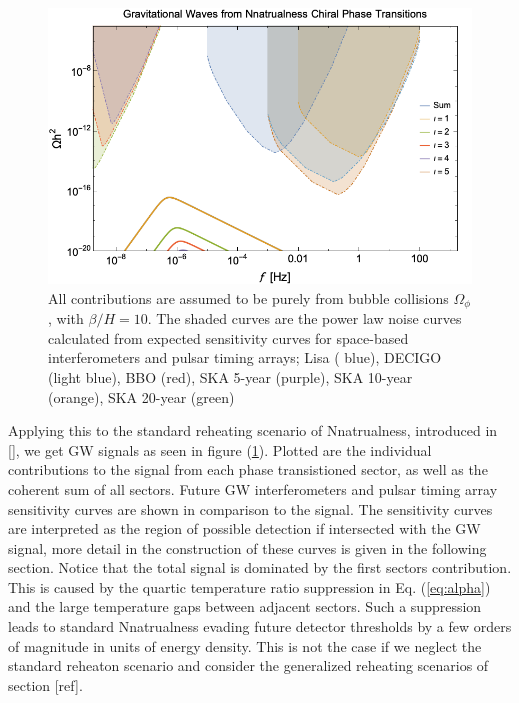 \documentclass[nofootinbib,twocolumn,preprintnumbers]{revtex4-1}
\begin{document}
\begin{figure}[h!]
\centering
\includegraphics[scale=.3]{Nnatral.png} 
\caption{ All contributions are assumed to be purely from bubble collisions $\Omega_{\phi}$, with $\beta/H  = 10$.  The shaded curves are the power law noise curves calculated from expected sensitivity curves for space-based interferometers and pulsar timing arrays; Lisa ( blue), DECIGO (light blue), BBO (red), SKA 5-year (purple), SKA 10-year (orange), SKA 20-year (green)   }
\label{fig::Nnatural}
\end{figure}
Applying this to the standard reheating scenario of Nnatrualness, introduced in [], we get GW signals as seen in figure (\ref{fig::Nnatural}). Plotted are the individual contributions to the signal from each phase transistioned sector, as well as the coherent sum of all sectors. Future GW interferometers and pulsar timing array sensitivity curves are shown in comparison to the signal. The sensitivity curves are interpreted as the region of possible detection if intersected with the GW signal, more detail in the construction of these curves is given in the following section. Notice that the total signal is dominated by the first sectors contribution. This is caused by the quartic temperature ratio suppression in Eq. (\ref{eq:alpha}) and the large temperature gaps between adjacent sectors. Such a suppression leads to standard Nnatrualness evading future detector thresholds by a few orders of magnitude in units of energy density. This is not the case if we neglect the standard reheaton scenario and consider the generalized reheating scenarios of section [ref]. 
\end{document}
